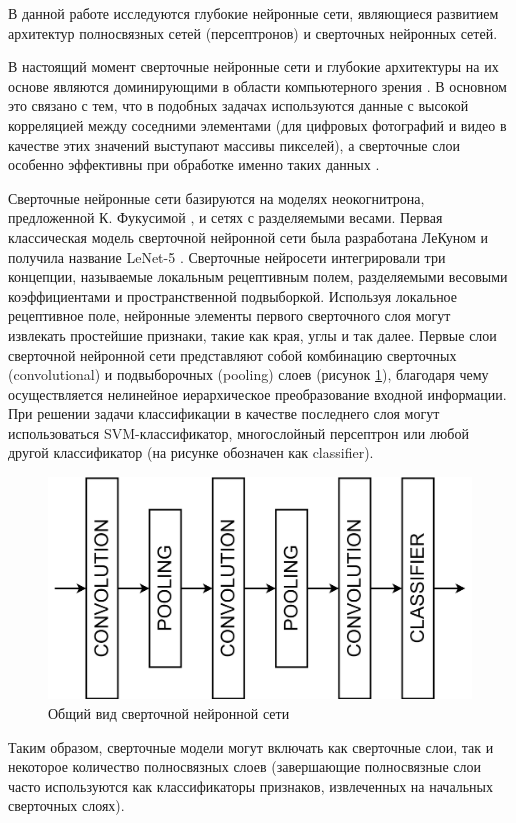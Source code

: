 В данной работе исследуются глубокие нейронные сети, являющиеся развитием архитектур полносвязных сетей (персептронов) и сверточных нейронных сетей.

В настоящий момент сверточные нейронные сети и глубокие архитектуры на их основе являются доминирующими в области компьютерного зрения \cite{LeCun2015}. В основном это связано с тем, что в подобных задачах используются данные с высокой корреляцией между соседними элементами (для цифровых фотографий и видео в качестве этих значений выступают массивы пикселей), а сверточные слои особенно эффективны при обработке именно таких данных \cite{Emmert2020}.

Сверточные нейронные сети базируются на моделях неокогнитрона, предложенной К. Фукусимой \cite{fukushima1980}, и сетях с разделяемыми весами. Первая классическая модель сверточной нейронной сети была разработана ЛеКуном и получила название LeNet-5 \cite{lekun1998}. Сверточные нейросети интегрировали три концепции, называемые локальным рецептивным полем, разделяемыми весовыми коэффициентами и пространственной подвыборкой. Используя локальное рецептивное поле, нейронные элементы первого сверточного слоя могут извлекать простейшие признаки, такие как края, углы и так далее. Первые слои сверточной нейронной сети представляют собой комбинацию сверточных (convolutional) и подвыборочных (pooling) слоев (рисунок \ref{fig:cnn_common_view}), благодаря чему осуществляется нелинейное иерархическое преобразование входной информации. При решении задачи классификации в качестве последнего слоя могут использоваться SVM-классификатор, многослойный персептрон или любой другой классификатор (на рисунке обозначен как classifier).

\begin{figure}[ht]
	\centering
	\includegraphics[width=14cm]{man-source/images/ch4/pic4-15.png}
	\caption{Общий вид сверточной нейронной сети}
	\label{fig:cnn_common_view}
\end{figure}
Таким образом, сверточные модели могут включать как сверточные слои, так и некоторое количество полносвязных слоев (завершающие полносвязные слои часто используются как классификаторы признаков, извлеченных на начальных сверточных слоях). %

